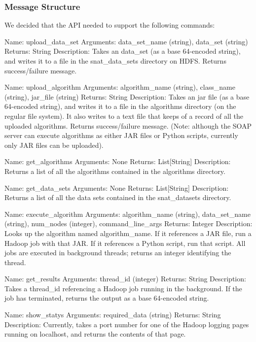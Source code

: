 \subsubsection{Message Structure}

We decided that the API needed to support the following commands:

Name: upload\_data\_set
Arguments: data\_set\_name (string), data\_set (string)
Returns: String
Description: Takes an data\_set (as a base 64-encoded string), and writes it to a file in the snat\_data\_sets directory on HDFS. Returns success/failure message.

Name: upload\_algorithm
Arguments: algorithm\_name (string), class\_name (string), jar\_file (string)
Returns: String
Description: Takes an jar file (as a base 64-encoded string), and writes it to a file in the algorithms directory (on the regular file system). It also writes to a text file that keeps of a record of all the uploaded algorithms. Returns success/failure message. (Note: although the SOAP server can execute algorithms as either JAR files or Python scripts, currently only JAR files can be uploaded).

Name: get\_algorithms
Arguments: None
Returns: List[String]
Description: Returns a list of all the algorithms contained in the algorithms directory.

Name: get\_data\_sets
Arguments: None
Returns: List[String]
Description: Returns a list of all the data sets contained in the snat\_datasets directory.

Name: execute\_algorithm
Arguments: algorithm\_name (string), data\_set\_name (string), num\_nodes (integer), command\_line\_args
Returns: Integer
Description: Looks up the algorithm named algorithm\_name. If it references a JAR file, run a Hadoop job with that JAR. If it references a Python script, run that script. All jobs are executed in background threads; returns an integer identifying the thread.

Name: get\_results
Arguments: thread\_id (integer)
Returns: String
Description: Takes a thread\_id referencing a Hadoop job running in the background. If the job has terminated, returns the output as a base 64-encoded string.

Name: show\_statys
Arguments: required\_data (string)
Returns: String
Description: Currently, takes a port number for one of the Hadoop logging pages running on localhost, and returns the contents of that page.


